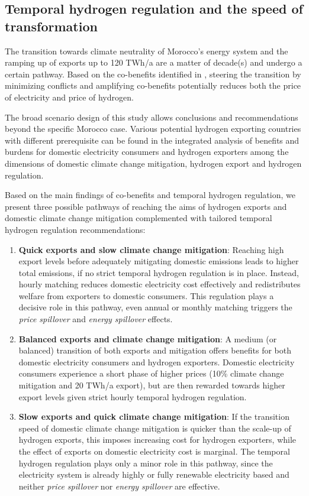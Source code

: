 

\subsection*{Temporal hydrogen regulation and the speed of transformation}
\label{subsec:timepath}
The transition towards climate neutrality of Morocco's energy system and the ramping up of exports up to 120 TWh/a are a matter of decade(s) and undergo a certain pathway. Based on the co-benefits identified in , steering the transition by minimizing conflicts and amplifying co-benefits potentially reduces both the price of electricity and price of hydrogen. 

The broad scenario design of this study allows conclusions and recommendations beyond the specific Morocco case.
Various potential hydrogen exporting countries with different prerequisite can be found in the integrated analysis of benefits and burdens for domestic electricity consumers and hydrogen exporters among the dimensions of domestic climate change mitigation, hydrogen export and hydrogen regulation.

Based on the main findings of co-benefits and temporal hydrogen regulation, we present three possible pathways of reaching the aims of hydrogen exports and domestic climate change mitigation complemented with tailored temporal hydrogen regulation recommendations:
\begin{enumerate}
    \item \textbf{Quick exports and slow climate change mitigation}: Reaching high export levels before adequately mitigating domestic emissions leads to higher total emissions, if no strict temporal hydrogen regulation is in place. Instead, hourly matching reduces domestic electricity cost effectively and redistributes welfare from exporters to domestic consumers. This regulation plays a decisive role in this pathway, even annual or monthly matching triggers the \textit{price spillover} and \textit{energy spillover} effects.
    \item \textbf{Balanced exports and climate change mitigation}: A medium (or balanced) transition of both exports and mitigation offers benefits for both domestic electricity consumers and hydrogen exporters. Domestic electricity consumers experience a short phase of higher prices (10\% climate change mitigation and 20 TWh/a export), but are then rewarded towards higher export levels given strict hourly temporal hydrogen regulation.
    \item \textbf{Slow exports and quick climate change mitigation}: If the transition speed of domestic climate change mitigation is quicker than the scale-up of hydrogen exports, this imposes increasing cost for hydrogen exporters, while the effect of exports on domestic electricity cost is marginal. The temporal hydrogen regulation plays only a minor role in this pathway, since the electricity system is already highly or fully renewable electricity based and neither \textit{price spillover} nor \textit{energy spillover} are effective.
\end{enumerate}

